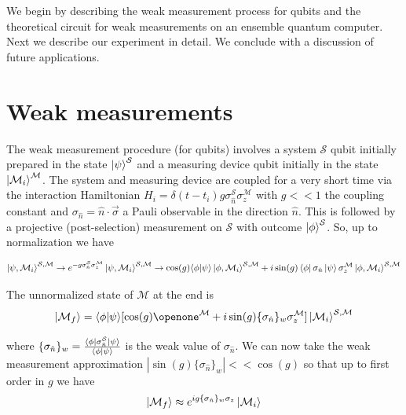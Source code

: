 \documentclass[aps,pra,12pt,onecolumn,showpacs,superscriptaddress,floatfix,footinbib,subfigure]{revtex4}
\def\bra#1{\mathinner{\langle{#1}|}}
\def\ket#1{\mathinner{|{#1}\rangle}}
\def\es{{\mathcal{S}}}
\def\md{{\mathcal{M}}}
\def\sm{{\es,\md}}
\def\sn{ \sigma_{ \hat{n} } }
\begin{document}
 We begin by describing the weak measurement process for qubits and the theoretical circuit  for weak measurements on an ensemble quantum computer. Next we describe our experiment in detail. We conclude with a discussion of future applications.


\section{Weak measurements}
The weak measurement  procedure (for qubits) \cite{Brun2008}  involves a system $\es$ qubit  initially prepared in the state $\ket{\psi}^\es$ and a measuring device qubit  initially in the state $\ket{\md_i}^\md$. The system and measuring device are coupled for a very short time  via the interaction  Hamiltonian  $H_i=\delta(t-t_i)g\sn^\es\sigma_z^\md$ with $g<<1$ the coupling constant and $\sn=\hat{n}\cdot\vec{\sigma}$ a Pauli observable in the direction $\hat{n}$.  This is followed by a projective (post-selection) measurement on $\es$ with outcome $\ket{\phi}^\es$. So, up to normalization we have

\begin{equation}
\ket{\psi,\md_i}^\sm\rightarrow e^{-g\sn^\es\sigma_z^\md}\ket{\psi,\md_i}^\sm \rightarrow \cos(g)\langle {\phi}|{\psi}\rangle \ket{\phi,\md_i}^\sm+i\sin(g)\bra{\phi}\sn\ket{\psi}\sigma_z^\md\ket{\phi,\md_i}^\sm
\end{equation}

The unnormalized state of $\md$ at the end is
\begin{equation}
\ket{\md_f}=\langle {\phi}|{\psi}\rangle[ \cos(g)\openone^\md+i\sin(g)\{\sn\}_w\sigma_z^\md]\ket{\md_i}^\sm
\end{equation}

where $\{\sn\}_w=\frac{\bra{\phi}\sn^\es\ket{\psi}}{\langle {\phi}|{\psi}\rangle}$ is the weak value of $\sn$. We can now take the weak measurement approximation $|\sin(g)\{\sn\}_w|<<\cos(g)$ so that up to first order in $g$ we have
\begin{equation}
\ket{\md_f}\approx e^{ig\{\sn\}_w\sigma_z}\ket{\md_i}
\end{equation}
\end{document}
